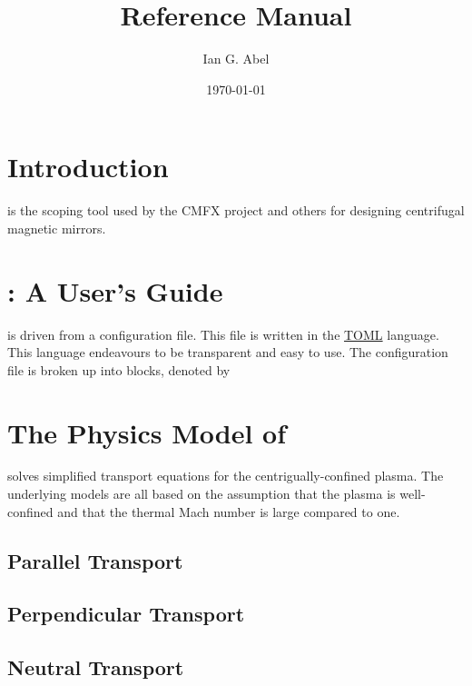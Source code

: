 \documentclass{revtex4}
\begin{document}
\date{\today}

\title{\mctrans Reference Manual}
\author{Ian G. Abel}


\maketitle
\section{Introduction}

\mctrans is the scoping tool used by the CMFX project and others for designing centrifugal magnetic mirrors.

\section{\mctrans: A User's Guide}

\mctrans is driven from a configuration file. This file is written in the \href{https://github.com/toml-lang/toml}{TOML} language. This language endeavours
to be transparent and easy to use. The configuration file is broken up into blocks, denoted by 

\section{The Physics Model of \mctrans}

\mctrans solves simplified transport equations for the centrigually-confined plasma. The underlying models are all based on the assumption that the plasma is well-confined and that the thermal Mach number is large compared to one.

\subsection{Parallel Transport}
\subsection{Perpendicular Transport}
\subsection{Neutral Transport}

\appendix
\end{document}
